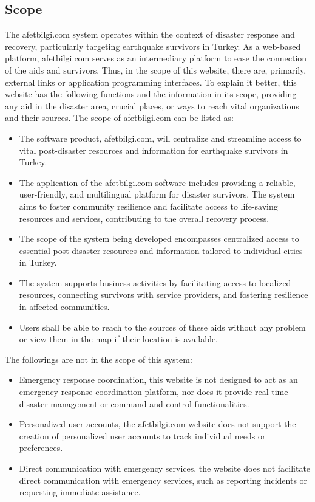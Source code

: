 \documentclass[11pt,a4paper]{article}
\begin{document}
\subsection{Scope}
The afetbilgi.com system operates within the context of disaster response and recovery, particularly targeting earthquake survivors in Turkey. As a web-based platform, afetbilgi.com serves as an intermediary platform to ease the connection of the aids and survivors. Thus, in the scope of this website, there are, primarily, external links or application programming interfaces. To explain it better, this website has the following functions and the information in its scope, providing any aid in the disaster area, crucial places, or ways to reach vital organizations and their sources.
The scope of afetbilgi.com can be listed as:

\begin{itemize}
  \item  The software product, afetbilgi.com, will centralize and streamline access to vital post-disaster resources and information for earthquake survivors in Turkey.
  \item The application of the afetbilgi.com software includes providing a reliable, user-friendly, and multilingual platform for disaster survivors. The system aims to foster community resilience and facilitate access to life-saving resources and services, contributing to the overall recovery process.
  \item The scope of the system being developed encompasses centralized access to essential post-disaster resources and information tailored to individual cities in Turkey. 
  \item The system supports business activities by facilitating access to localized resources, connecting survivors with service providers, and fostering resilience in affected communities.
  \item Users shall be able to reach to the sources of these aids without any problem or view them in the map if their location is available.
\end{itemize}
The followings are not in the scope of this system:
\begin{itemize}
  \item Emergency response coordination, this website is not designed to act as an emergency response coordination platform, nor does it provide real-time disaster management or command and control functionalities.
  \item Personalized user accounts, the afetbilgi.com website does not support the creation of personalized user accounts to track individual needs or preferences.
  \item Direct communication with emergency services, the website does not facilitate direct communication with emergency services, such as reporting incidents or requesting immediate assistance.
\end{itemize}
\end{document}
